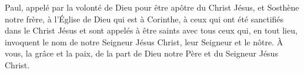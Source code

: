 Paul, appelé par la volonté de Dieu pour être apôtre du Christ Jésus,
	et Sosthène notre frère,
	à l’Église de Dieu qui est à Corinthe,
	à ceux qui ont été sanctifiés dans le Christ Jésus
		et sont appelés à être saints
	avec tous ceux qui, en tout lieu,
		invoquent le nom de notre Seigneur Jésus Christ,
	leur Seigneur et le nôtre.
À vous, la grâce et la paix,
	de la part de Dieu notre Père et du Seigneur Jésus Christ.
